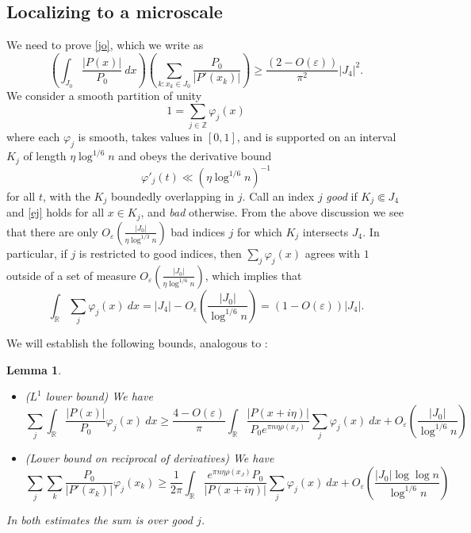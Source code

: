 \documentclass[12pt]{amsart}
\newtheorem{lemma}[theorem]{Lemma}
\newcommand{\eps}{\varepsilon}
\newcommand{\R}{\mathbb{R}}
\newcommand{\Z}{\mathbb{Z}}
\begin{document}
\subsection{Localizing to a microscale}

We need to prove \eqref{jo}, which we write as
\begin{equation}\label{jo2}
 \left( \int_{J_0} \frac{|P(x)|}{P_0}\ dx \right) \left( \sum_{k: x_k \in J_0} \frac{P_0}{|P'(x_k)|} \right) \geq \frac{(2-O(\eps))}{\pi^2} |J_4|^2.
\end{equation}
We consider a smooth partition of unity
$$ 1 = \sum_{j \in \Z} \varphi_j(x)$$
where each $\varphi_j$ is smooth, takes values in $[0,1]$, and is supported on an interval $K_j$ of length $\eta \log^{1/6} n$ and obeys the derivative bound
\begin{equation}\label{derivb}
 \varphi'_j(t) \ll (\eta \log^{1/6} n)^{-1}
\end{equation}
for all $t$, with the $K_j$ boundedly overlapping in $j$.  Call an index $j$ \emph{good} if $K_j \Subset J_4$ and \eqref{ej} holds for all $x \in K_j$, and \emph{bad} otherwise.  From the above discussion we see that there are only $O_\eps( \frac{|J_0|}{\eta \log^{1/3} n} )$ bad indices $j$ for which $K_j$ intersects $J_4$.  In particular, if $j$ is restricted to good indices, then $\sum_j \varphi_j(x)$ agrees with $1$ outside of a set of measure $O_\eps( \frac{|J_0|}{\eta \log^{1/6} n} )$, which implies that
\begin{equation}\label{stim}
\int_\R \sum_j \varphi_j(x)\ dx = |J_4| - O_\eps\left( \frac{|J_0|}{\log^{1/6} n} \right) = (1-O(\eps)) |J_4| .
\end{equation}

We will establish the following bounds, analogous to :

\begin{lemma}\label{newtrig}\
    \begin{itemize}
\item[(i)] ($L^1$ lower bound) We have
\begin{equation}\label{a-low}
\sum_j \int_\R \frac{|P(x)|}{P_0} \varphi_j(x)\ dx \geq \frac{4 - O(\eps)}{\pi} \int_\R \frac{|P(x+i\eta)|}{P_0 e^{\pi n \eta \rho(x_J)}} \sum_j \varphi_j(x)\ dx + O_\eps\left( \frac{|J_0|}{\log^{1/6} n} \right)
\end{equation}
\item[(ii)] (Lower bound on reciprocal of derivatives) We have
\begin{equation}\label{b-low}
\sum_j \sum_k \frac{P_0}{|P'(x_k)|} \varphi_j(x_k) \geq \frac{1}{2\pi} \int_\R \frac{e^{\pi n \eta \rho(x_J)} P_0}{|P(x+i\eta)|} \sum_j \varphi_j(x)\ dx + O_\eps\left( \frac{|J_0|\log\log n}{\log^{1/6} n} \right)
\end{equation}
\end{itemize}
In both estimates the sum is over good $j$.
\end{lemma}
\end{document}

